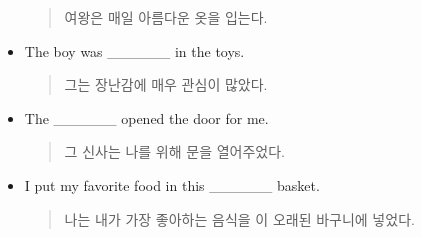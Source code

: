 \documentclass{article}
\begin{document}
\begin{addmargin}[1em]{1em}
\begin{itemize}
\begin{quote}
    여왕은 매일 아름다운 옷을 입는다.
    \end{quote}
    \item The boy was \_\_\_\_\_\_ in the toys.
    \begin{quote}
    그는 장난감에 매우 관심이 많았다.
    \end{quote}
    \item The \_\_\_\_\_\_ opened the door for me.
    \begin{quote}
    그 신사는 나를 위해 문을 열어주었다.
    \end{quote}
    \item I put my favorite food in this \_\_\_\_\_\_ basket.
    \begin{quote}
    나는 내가 가장 좋아하는 음식을 이 오래된 바구니에 넣었다.
    \end{quote}
\end{itemize}
\end{addmargin}
\end{document}
